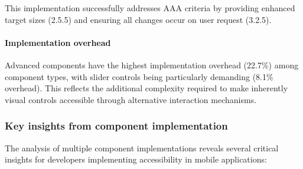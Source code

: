 This implementation successfully addresses AAA criteria by providing enhanced target sizes (2.5.5) and ensuring all changes occur on user request (3.2.5).

\paragraph{Implementation overhead}

Advanced components have the highest implementation overhead (22.7\%) among component types, with slider controls being particularly demanding (8.1\% overhead). This reflects the additional complexity required to make inherently visual controls accessible through alternative interaction mechanisms.

\subsubsection{Key insights from component implementation}
\label{subsubsec:component-insights}

The analysis of multiple component implementations reveals several critical insights for developers implementing accessibility in mobile applications:

